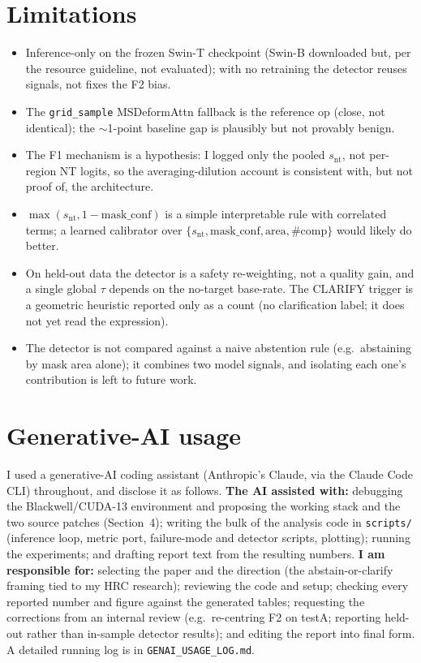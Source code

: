 \documentclass[11pt]{article}
\newcommand{\code}[1]{\texttt{\small #1}}
\begin{document}
\section{Limitations}
\begin{itemize}
\item Inference-only on the frozen Swin-T checkpoint (Swin-B downloaded but, per the resource
guideline, not evaluated); with no retraining the detector reuses signals, not fixes the F2 bias.
\item The \code{grid\_sample} MSDeformAttn fallback is the reference op (close, not identical); the
$\sim$1-point baseline gap is plausibly but not provably benign.
\item The F1 mechanism is a hypothesis: I logged only the pooled $s_\mathrm{nt}$, not per-region NT
logits, so the averaging-dilution account is consistent with, but not proof of, the architecture.
\item $\max(s_\mathrm{nt},1-\mathrm{mask\_conf})$ is a simple interpretable rule with correlated
terms; a learned calibrator over $\{s_\mathrm{nt},\mathrm{mask\_conf},\mathrm{area},\#\mathrm{comp}\}$
would likely do better.
\item On held-out data the detector is a safety re-weighting, not a quality gain, and a single global
$\tau$ depends on the no-target base-rate. The CLARIFY trigger is a geometric heuristic reported only
as a count (no clarification label; it does not yet read the expression).
\item The detector is not compared against a naive abstention rule (e.g.\ abstaining by mask area
alone); it combines two model signals, and isolating each one's contribution is left to future work.
\end{itemize}

\section{Generative-AI usage}
I used a generative-AI coding assistant (Anthropic's Claude, via the Claude Code CLI) throughout, and
disclose it as follows. \textbf{The AI assisted with:} debugging the Blackwell/CUDA-13 environment and
proposing the working stack and the two source patches (Section~4); writing the bulk of the analysis
code in \code{scripts/} (inference loop, metric port, failure-mode and detector scripts, plotting);
running the experiments; and drafting report text from the resulting numbers. \textbf{I am responsible
for:} selecting the paper and the direction (the abstain-or-clarify framing tied to my HRC research);
reviewing the code and setup; checking every reported number and figure against the generated tables;
requesting the corrections from an internal review (e.g.\ re-centring F2 on testA; reporting held-out
rather than in-sample detector results); and editing the report into final form. A detailed running
log is in \code{GENAI\_USAGE\_LOG.md}.
\end{document}
